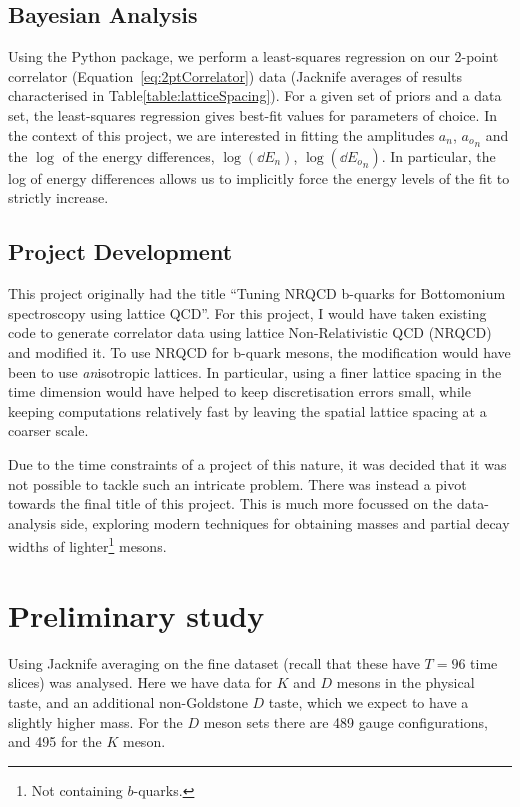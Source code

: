 \documentclass[a4paper,12pt]{article}
\begin{document}
\subsection{Bayesian Analysis}
Using the  Python package, we perform a least-squares regression on our 2-point correlator (Equation~\ref{eq:2ptCorrelator}) data (Jacknife averages of results characterised in Table\ref{table:latticeSpacing}). For a given set of priors and a data set, the least-squares regression gives best-fit values for parameters of choice. In the context of this project, we are interested in fitting the amplitudes $a_n$, ${a_o}_n$ and the $\log$ of the energy differences, $\log(\dd E_n)$, $\log({\dd E_o}_n)$. In particular, the log of energy differences allows us to implicitly force the energy levels of the fit to strictly increase.

\subsection{Project Development}
This project originally had the title ``Tuning NRQCD b-quarks for Bottomonium spectroscopy using lattice QCD''. For this project, I would have taken existing code to generate correlator data using lattice Non-Relativistic QCD (NRQCD) and modified it. To use NRQCD for b-quark mesons, the modification would have been to use \emph{an}isotropic lattices. In particular, using a finer lattice spacing in the time dimension would have helped to keep discretisation errors small, while keeping computations relatively fast by leaving the spatial lattice spacing at a coarser scale.

Due to the time constraints of a project of this nature, it was decided that it was not possible to tackle such an intricate problem. There was instead a pivot towards the final title of this project. This is much more focussed on the data-analysis side, exploring modern techniques for obtaining masses and partial decay widths of lighter\footnote{Not containing $b$-quarks.} mesons.

\section{Preliminary study}

Using Jacknife averaging on the fine dataset (recall that these have $T=96$ time slices) was analysed. Here we have data for $K$ and $D$ mesons in the physical taste, and an additional non-Goldstone $D$ taste, which we expect to have a slightly higher mass. For the $D$ meson sets there are 489 gauge configurations, and 495 for the $K$ meson. 
\end{document}
